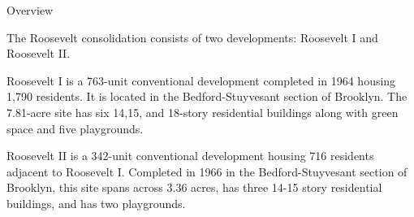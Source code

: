 Overview 

The Roosevelt consolidation consists of two developments: Roosevelt I and Roosevelt II. 

Roosevelt I is a 763-unit conventional development completed in 1964 housing 1,790 residents. It is located in the Bedford-Stuyvesant section of Brooklyn. The 7.81-acre site has six 14,15, and 18-story residential buildings along with green space and five playgrounds. 

Roosevelt II is a 342-unit conventional development housing 716 residents adjacent to Roosevelt I. Completed in 1966 in the Bedford-Stuyvesant section of Brooklyn, this site spans across 3.36 acres, has three 14-15 story residential buildings, and has two playgrounds. 